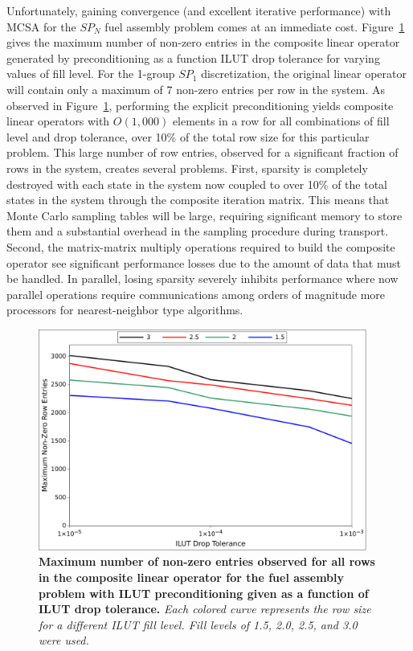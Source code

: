 Unfortunately, gaining convergence (and excellent iterative
performance) with MCSA for the $SP_N$ fuel assembly problem comes at
an immediate cost. Figure~\ref{fig:ilut_size} gives the maximum number
of non-zero entries in the composite linear operator generated by
preconditioning as a function ILUT drop tolerance for varying values
of fill level. For the 1-group $SP_1$ discretization, the original
linear operator will contain only a maximum of 7 non-zero entries per
row in the system. As observed in Figure~\ref{fig:ilut_size},
performing the explicit preconditioning yields composite linear
operators with $O(1,000)$ elements in a row for all combinations of
fill level and drop tolerance, over 10\% of the total row size for
this particular problem. This large number of row entries, observed
for a significant fraction of rows in the system, creates several
problems. First, sparsity is completely destroyed with each state in
the system now coupled to over 10\% of the total states in the system
through the composite iteration matrix. This means that Monte Carlo
sampling tables will be large, requiring significant memory to store
them and a substantial overhead in the sampling procedure during
transport. Second, the matrix-matrix multiply operations required to
build the composite operator see significant performance losses due to
the amount of data that must be handled. In parallel, losing sparsity
severely inhibits performance where now parallel operations require
communications among orders of magnitude more processors for
nearest-neighbor type algorithms.

\begin{figure}[t!]
  \begin{center}
    \includegraphics[width=4.25in]{chapters/spn_equations/ilut_size.pdf}
  \end{center}
  \caption{\textbf{Maximum number of non-zero entries observed for all
      rows in the composite linear operator for the fuel assembly
      problem with ILUT preconditioning given as a function of ILUT
      drop tolerance.} \textit{Each colored curve represents the row
      size for a different ILUT fill level. Fill levels of 1.5, 2.0,
      2.5, and 3.0 were used.}}
  \label{fig:ilut_size}
\end{figure}

